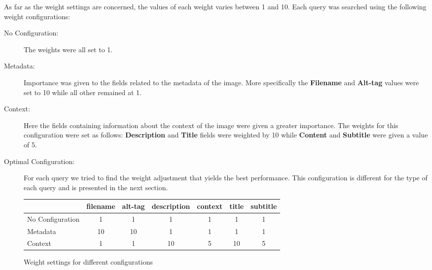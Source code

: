 \documentclass[a4paper]{article}
\begin{document}

As far as the weight settings are concerned, the values of each weight varies between 1 and 10. 
Each query was searched using the following weight configurations: 
\begin{description}
  \item[No Configuration:] The weights were all set to 1. 
  \item[Metadata:] Importance was given to the fields related to the metadata of the image. More specifically the   \textbf{Filename} and \textbf{Alt-tag} values were set to 10 while all other remained at 1.
  \item[Context:] Here the fields containing information about the context of the image were given a greater importance. The weights for this configuration were set as follows: \textbf{Description} and \textbf{Title} fields were weighted by 10 while \textbf{Content} and \textbf{Subtitle} were given a value of 5.
  \item[Optimal Configuration:] For each query we tried to find the weight adjustment that yields the best performance. This configuration is different for the type of each query and is presented in the next section. 
\end{description}

\begin{figure}
\begin{center}
\begin{tabular}{| l || c | c | c | c | c | c |}
\hline
                                 & filename & alt-tag & description & context & title & subtitle \\ \hline
 No Configuration     & 1 & 1 & 1 & 1 & 1 & 1 \\ \hline
 Metadata                 & 10 & 10 & 1 & 1 & 1 & 1\\ \hline
 Context                    & 1 & 1 & 10 & 5 & 10 & 5 \\ \hline
\hline
\end{tabular}
\caption {Weight settings for different configurations}
\label{weightconfig}
\end{center}
\end{figure}
\end{document}
